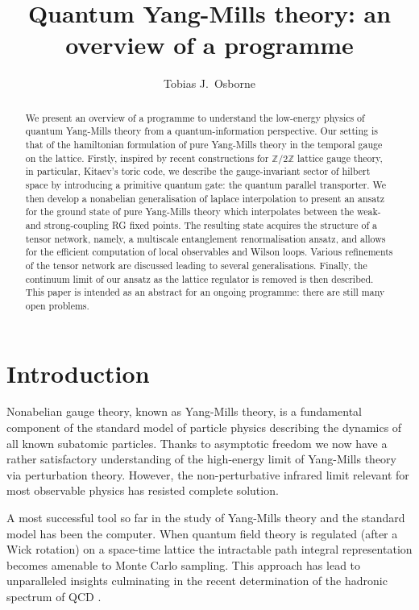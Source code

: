 \documentclass[twocolumn,lengthcheck,superscriptaddress]{revtex4-1}
\theoremstyle{definition}
\theoremstyle{remark}
\begin{document}
\title{Quantum Yang-Mills theory: an overview of a programme}

\author{Tobias J.\ Osborne}

\begin{abstract}
We present an overview of a programme to understand the low-energy physics of quantum Yang-Mills theory from a quantum-information perspective. Our setting is that of the hamiltonian formulation of pure Yang-Mills theory in the temporal gauge on the lattice. Firstly, inspired by recent constructions for $\mathbb{Z}/2\mathbb{Z}$ lattice gauge theory, in particular, Kitaev's toric code, we describe the gauge-invariant sector of hilbert space by introducing a primitive quantum gate:  the quantum parallel transporter. We then develop a nonabelian generalisation of laplace interpolation to present an ansatz for the ground state of pure Yang-Mills theory which interpolates between the weak- and strong-coupling RG fixed points. The resulting state acquires the structure of a tensor network, namely, a multiscale entanglement renormalisation ansatz, and allows for the efficient computation of local observables and Wilson loops. Various refinements of the tensor network are discussed leading to several generalisations. Finally, the continuum limit of our ansatz as the lattice regulator is removed is then described. This paper is intended as an abstract for an ongoing programme: there are still many open problems.
\end{abstract}

\maketitle

\section{Introduction}
Nonabelian gauge theory, known as Yang-Mills theory, is a fundamental component of the standard model of particle physics describing the dynamics of all known subatomic particles. Thanks to asymptotic freedom we now have a rather satisfactory understanding of the high-energy limit of Yang-Mills theory via perturbation theory. However, the non-perturbative infrared limit relevant for most observable physics has resisted complete solution. 

A most successful tool so far in the study of Yang-Mills theory and the standard model has been the computer. When quantum field theory is regulated (after a Wick rotation) on a space-time lattice \cite{wilson:1974b, creutz:1985a} the intractable path integral representation becomes amenable to Monte Carlo sampling. This approach has lead to unparalleled insights culminating in the recent determination of the hadronic spectrum of QCD \cite{duerr:2008a}. 
\end{document}
